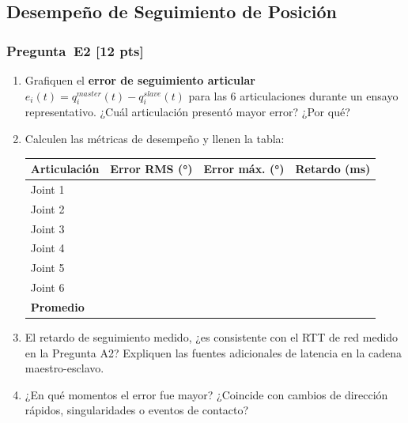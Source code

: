 \documentclass[journal,10pt,twoside]{IEEEtran}
\newcommand{\answerline}[1][3cm]{\underline{\hspace{#1}}}
\newcommand{\pts}[1]{\textbf{\color{tec_red}[#1 pts]}}
\begin{document}
\subsection{Desempeño de Seguimiento de Posición}

\subsubsection*{Pregunta~E2 \pts{12}}
\begin{enumerate}[label=(\alph*)]
  \item Grafiquen el \textbf{error de seguimiento articular}
        $e_i(t) = q_i^{master}(t) - q_i^{slave}(t)$ para
        las 6 articulaciones durante un ensayo representativo.
        ¿Cuál articulación presentó mayor error? ¿Por qué?
  \item Calculen las métricas de desempeño y llenen la tabla:

  \begin{center}
  \small
  \begin{tabular}{lccc}
    \toprule
    \textbf{Articulación} & \textbf{Error RMS (°)} & \textbf{Error máx. (°)} & \textbf{Retardo (ms)} \\
    \midrule
    Joint 1 & \answerline & \answerline & \answerline \\
    Joint 2 & \answerline & \answerline & \answerline \\
    Joint 3 & \answerline & \answerline & \answerline \\
    Joint 4 & \answerline & \answerline & \answerline \\
    Joint 5 & \answerline & \answerline & \answerline \\
    Joint 6 & \answerline & \answerline & \answerline \\
    \midrule
    \textbf{Promedio} & \answerline & \answerline & \answerline \\
    \bottomrule
  \end{tabular}
  \end{center}

  \item El retardo de seguimiento medido, ¿es consistente con el RTT
        de red medido en la Pregunta A2? Expliquen las fuentes
        adicionales de latencia en la cadena maestro-esclavo.
  \item ¿En qué momentos el error fue mayor? ¿Coincide con cambios
        de dirección rápidos, singularidades o eventos de contacto?
\end{enumerate}
\end{document}

